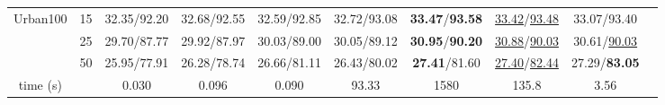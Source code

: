 \documentclass[lettersize,journal]{IEEEtran}
\begin{document}
\begin{table*}[ht]
{\begin{tabular}{cccccccccc}
\multirow{3}{*}{Urban100 \cite{Urban100}} 
& 15 & 32.35/92.20 & 32.68/92.55 & 32.59/92.85 & 32.72/93.08 & {\bf 33.47}/{\bf 93.58} & \underline{33.42}/\underline{93.48} & 33.07/93.40 \\
& 25 & 29.70/87.77 & 29.92/87.97 & 30.03/89.00 & 30.05/89.12 & {\bf 30.95}/{\bf 90.20}
& \underline{30.88}/\underline{90.03} & 30.61/\underline{90.03} \\
& 50 & 25.95/77.91 & 26.28/78.74 & 26.66/81.11 & 26.43/80.02 & {\bf 27.41}/81.60 & \underline{27.40}/\underline{82.44} & 27.29/{\bf 83.05} \\
time (s) & & 0.030 & 0.096 & 0.090 & 93.33 & 1580 & 135.8 & 3.56 \\\hline
\end{tabular}
}
\label{tab:graysingle}
\end{table*}
\end{document}
